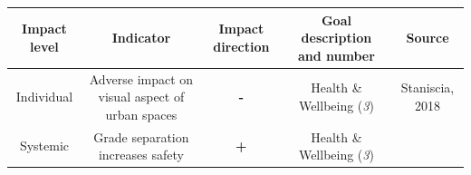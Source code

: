 \documentclass[
]{book}
\begin{document}
\begin{longtable}[]{@{}ccccc@{}}
\toprule
\begin{minipage}[b]{0.17\columnwidth}\centering
Impact level\strut
\end{minipage} & \begin{minipage}[b]{0.16\columnwidth}\centering
Indicator\strut
\end{minipage} & \begin{minipage}[b]{0.17\columnwidth}\centering
Impact direction\strut
\end{minipage} & \begin{minipage}[b]{0.17\columnwidth}\centering
Goal description and number\strut
\end{minipage} & \begin{minipage}[b]{0.17\columnwidth}\centering
Source\strut
\end{minipage}\tabularnewline
\midrule
\endhead
\begin{minipage}[t]{0.17\columnwidth}\centering
Individual\strut
\end{minipage} & \begin{minipage}[t]{0.16\columnwidth}\centering
Adverse impact on visual aspect of urban spaces\strut
\end{minipage} & \begin{minipage}[t]{0.17\columnwidth}\centering
\textbf{-}\strut
\end{minipage} & \begin{minipage}[t]{0.17\columnwidth}\centering
Health \& Wellbeing (\emph{3})\strut
\end{minipage} & \begin{minipage}[t]{0.17\columnwidth}\centering
Staniscia, 2018\strut
\end{minipage}\tabularnewline
\begin{minipage}[t]{0.17\columnwidth}\centering
Systemic\strut
\end{minipage} & \begin{minipage}[t]{0.16\columnwidth}\centering
Grade separation increases safety\strut
\end{minipage} & \begin{minipage}[t]{0.17\columnwidth}\centering
\textbf{+}\strut
\end{minipage} & \begin{minipage}[t]{0.17\columnwidth}\centering
Health \& Wellbeing (\emph{3})\strut
\end{minipage} & \begin{minipage}[t]{0.17\columnwidth}\centering

\end{minipage}
\end{longtable}
\end{document}
